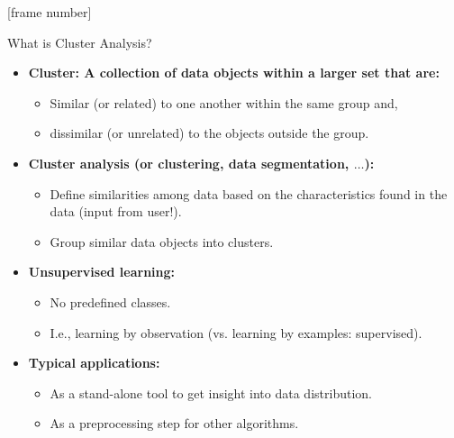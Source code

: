 \documentclass[aspectratio=169,t,xcolor=dvipsnames]{beamer}
\begin{document}
  {
    [frame number]
    \begin{frame}{What is Cluster Analysis?}
        \begin{itemize}
          \item \textbf{{\color{airforceblue}Cluster}: A collection of data objects within a larger set that are:}
          \begin{itemize}
            \item {\color{airforceblue}Similar (or related)} to one another within the same group and,
            \item dissimilar (or unrelated) to the objects outside the group.
          \end{itemize}
          \item \textbf{{\color{airforceblue}Cluster analysis} (or clustering, data segmentation, $\ldots$):}
          \begin{itemize}
            \item {\color{airforceblue}Define similarities} among data based on the characteristics found in the data (input from user!).
            \item Group similar data objects into clusters.
          \end{itemize}
          \item \textbf{Unsupervised learning:}
          \begin{itemize}
            \item No predefined classes.
            \item I.e., learning by observation (vs. learning by examples: supervised).
          \end{itemize}
          \item \textbf{Typical applications:}
          \begin{itemize}
            \item As a stand-alone tool to get insight into data distribution.
            \item As a preprocessing step for other algorithms.
          \end{itemize}
        \end{itemize}
    \end{frame}
  }
\end{document}
